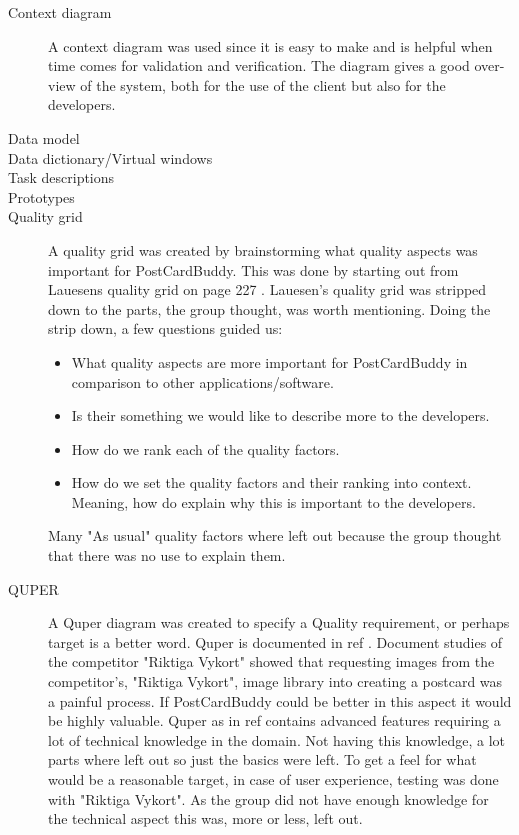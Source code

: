 \documentclass[10pt,a4paper]{article}
\begin{document}
\begin{description}
\item[Context diagram] A context diagram was used since it is easy to make and is helpful when time comes for validation and verification. The diagram gives a good over-view of the system, both for the use of the client but also for the developers. 

\item[Data model]

\item[Data dictionary/Virtual windows]

\item[Task descriptions]

\item[Prototypes]

\item[Quality grid]
A quality grid was created by brainstorming what quality aspects was important for PostCardBuddy. This was done by starting out from Lauesens quality grid on page 227 \cite{soren}. Lauesen's quality grid was stripped down to the parts, the group thought, was worth mentioning. Doing the strip down, a few questions guided us:
\begin{itemize}
\item What quality aspects are more important for PostCardBuddy in comparison to other applications/software.
\item Is their something we would like to describe more to the developers.
\item How do we rank each of the quality factors.
\item How do we set the quality factors and their ranking into context. Meaning, how do explain why this is important to the developers.
\end{itemize}

Many "As usual" quality factors where left out because the group thought that there was no use to explain them.

\item[QUPER]
A Quper diagram was created to specify a Quality requirement, or perhaps target is a better word. Quper is documented in ref \cite{soren}. Document studies of the competitor "Riktiga Vykort" showed that requesting images from the competitor's, "Riktiga Vykort", image library into creating a postcard was a painful process. If PostCardBuddy could be better in this aspect it would be highly valuable. Quper as in ref \cite{soren} contains advanced features requiring a lot of technical knowledge in the domain. Not having this knowledge, a lot parts where left out so just the basics were left. To get a feel for what would be a reasonable target, in case of user experience, testing was done with "Riktiga Vykort". As the group did not have enough knowledge for the technical aspect this was, more or less, left out.


\end{description}
\end{document}
